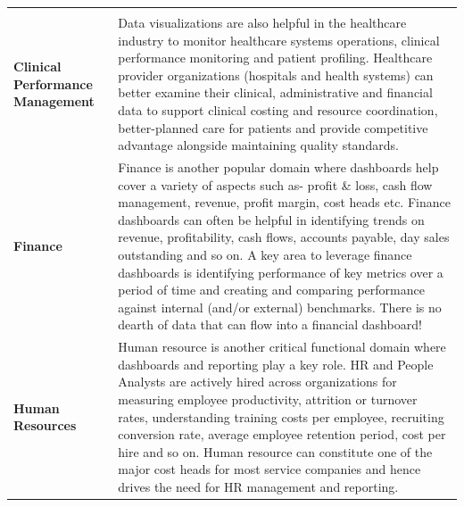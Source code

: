 \documentclass[]{book}
\begin{document}
\begin{longtable}[]{@{}ll@{}}
\begin{minipage}[t]{0.79\columnwidth}
\end{minipage}\tabularnewline
\begin{minipage}[t]{0.15\columnwidth}\raggedright
\textbf{Clinical Performance Management}\strut
\end{minipage} & \begin{minipage}[t]{0.79\columnwidth}\raggedright
Data visualizations are also helpful in the healthcare industry to monitor healthcare systems operations, clinical performance monitoring and patient profiling. Healthcare provider organizations (hospitals and health systems) can better examine their clinical, administrative and financial data to support clinical costing and resource coordination, better-planned care for patients and provide competitive advantage alongside maintaining quality standards.\strut
\end{minipage}\tabularnewline
\begin{minipage}[t]{0.15\columnwidth}\raggedright
\textbf{Finance}\strut
\end{minipage} & \begin{minipage}[t]{0.79\columnwidth}\raggedright
Finance is another popular domain where dashboards help cover a variety of aspects such as- profit \& loss, cash flow management, revenue, profit margin, cost heads etc. Finance dashboards can often be helpful in identifying trends on revenue, profitability, cash flows, accounts payable, day sales outstanding and so on. A key area to leverage finance dashboards is identifying performance of key metrics over a period of time and creating and comparing performance against internal (and/or external) benchmarks. There is no dearth of data that can flow into a financial dashboard!\strut
\end{minipage}\tabularnewline
\begin{minipage}[t]{0.15\columnwidth}\raggedright
\textbf{Human Resources}\strut
\end{minipage} & \begin{minipage}[t]{0.79\columnwidth}\raggedright
Human resource is another critical functional domain where dashboards and reporting play a key role. HR and People Analysts are actively hired across organizations for measuring employee productivity, attrition or turnover rates, understanding training costs per employee, recruiting conversion rate, average employee retention period, cost per hire and so on. Human resource can constitute one of the major cost heads for most service companies and hence drives the need for HR management and reporting.\strut
\end{minipage}\tabularnewline
\bottomrule
\end{longtable}
\end{document}

